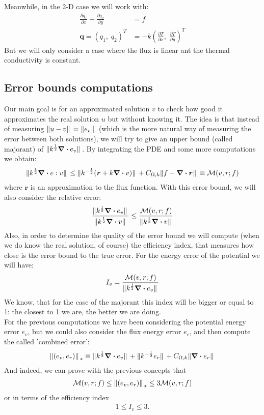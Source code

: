 \documentclass{article}
\begin{document}
	Meanwhile, in the 2-D case we will work with:
	\begin{align*}
	\frac{\partial q_1}{\partial x} + \frac{\partial q_2}{\partial y}  &= f \\
	\bm{q} = (q_1,\; q_2)^T  &= -k \left( \frac{\partial T}{\partial x} ,\; \frac{\partial T}{\partial y}\right)^T
	\end{align*}
	But we will only consider a case where the flux is linear ant the thermal conductivity is constant.
	
	\subsection*{Error bounds computations}
	Our main goal is for an approximated solution $v$ to check how good it approximates the real solution $u$ but without knowing it.
	The idea is that instead of measuring $\norm*{u-v} = \norm*{e_v}$ (which is the more natural way of measuring the error between both solutions), we will try to give an upper bound (called majorant) of $\norm*{k^{\frac{1}{2}}\div e_v}$. By integrating the PDE and some more computations we obtain:
	\begin{align*}
	\norm*{k^{\frac{1}{2}}\div e:v} \leq \norm*{k^{-\frac{1}{2}}(\bm{r}+k\div v)} + C_{\Omega,k}\norm*{f-\div \bm{r}} \equiv \mathcal{M}(v,r;f)
	\end{align*}
	where $\bm{r}$ is an approximation to the flux function.
	With this error bound, we will also consider the relative error:
	\begin{align*}
	\frac{\norm*{k^{\frac{1}{2}}\div e_v}}{\norm*{k^{\frac{1}{2}}\div v}} \leq \frac{\mathcal{M}(v,r;f)}{\norm*{k^{\frac{1}{2}}\div v}}
	\end{align*}
	Also, in order to determine the quality of the error bound we will compute (when we do know the real solution, of course) the efficiency index, that measures how close is the error bound to the true error. For the energy error of the potential we will have:
	\begin{align*}
	I_v = \frac{\mathcal{M}(v,r;f)}{\norm*{k^{\frac{1}{2}}\div e_v}}
	\end{align*}
	We know, that for the case of the majorant this index will be bigger or equal to 1: the closest to 1 we are, the better we are doing.\\
	For the previous computations we have been considering the potential energy error $e_v$, but we could also consider the flux energy error $e_r$, and then compute the called 'combined error':
	\begin{align*}
	\norm*{(e_v,e_r)}_{*} \equiv \norm*{k^{\frac{1}{2}}\div e_v} + \norm*{k^{-\frac{1}{2}}e_r} + C_{\Omega,k}\norm*{\div e_r}
	\end{align*} 
	And indeed, we can prove with the previous concepts that 
	\begin{align*}
	\mathcal{M}(v,r;f) \leq  \norm*{(e_v,e_r)}_{*}  \leq 3\mathcal{M}(v,r;f)
	\end{align*}
	or in terms of the efficiency index
	\begin{align*}
	1 \leq I_v \leq 3.
	\end{align*}
	
\end{document}
